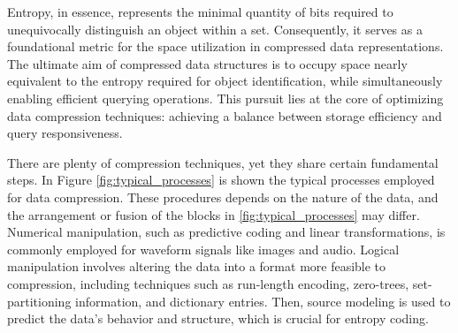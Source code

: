 Entropy, in essence, represents the minimal quantity of bits required to unequivocally distinguish an object within a set. Consequently, it serves as a foundational metric for the space utilization in compressed data representations. The ultimate aim of compressed data structures is to occupy space nearly equivalent to the entropy required for object identification, while simultaneously enabling efficient querying operations. This pursuit lies at the core of optimizing data compression techniques: achieving a balance between storage efficiency and query responsiveness. \vspace{0.4cm}

\noindent There are plenty of compression techniques, yet they share certain fundamental steps. In Figure \ref{fig:typical_processes} is shown the typical processes employed for data compression. These procedures depends on the nature of the data, and the arrangement or fusion of the blocks in \ref{fig:typical_processes} may differ. Numerical manipulation, such as predictive coding and linear transformations, is commonly employed for waveform signals like images and audio. Logical manipulation involves altering the data into a format more feasible to compression, including techniques such as run-length encoding, zero-trees, set-partitioning information, and dictionary entries. Then, source modeling is used to predict the data's behavior and structure, which is crucial for entropy coding.

